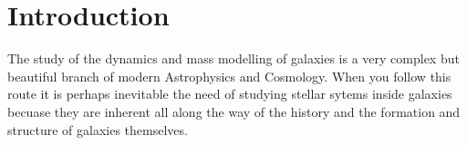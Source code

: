 \chapter{Introduction}

The study of the dynamics and mass modelling of galaxies is a very complex but beautiful branch of modern Astrophysics and Cosmology. When you follow this route it is perhaps inevitable the need of studying stellar sytems inside galaxies becuase they are inherent all along the way of the history and the formation and structure of galaxies themselves. 
